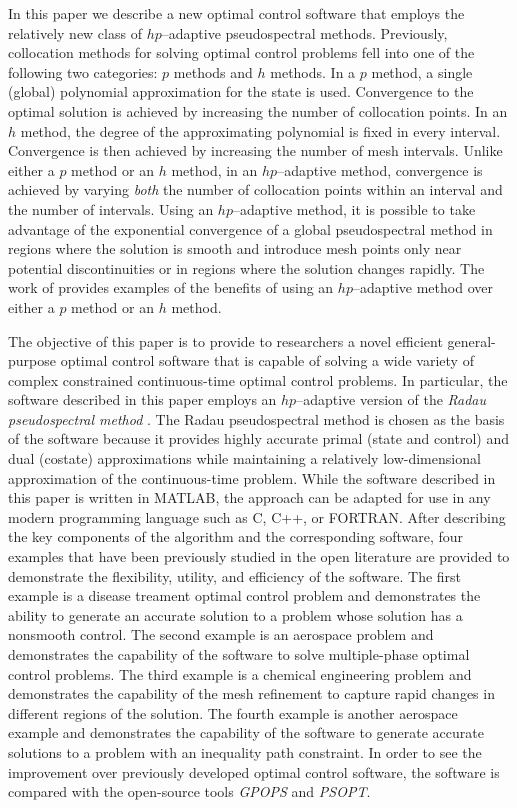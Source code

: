 \documentclass[prodmode,acmtecs]{acmsmall}
\begin{document}
In this paper we describe a new optimal control software that employs
the relatively new class of $hp$--adaptive pseudospectral methods.
Previously, collocation methods for solving optimal control problems
fell into one of the following two categories:  $p$ methods and $h$
methods.  In a $p$ method, a single (global) polynomial approximation
for the state 
is used.  Convergence to the optimal solution is achieved by
increasing the number of collocation points.  In an $h$ method, the
degree of the approximating polynomial is fixed in every interval.
Convergence is then achieved by increasing the number of mesh
intervals.  Unlike either a $p$ method or an $h$ method, in an
$hp$--adaptive method, convergence is achieved by varying {\em both}
the number of collocation points within an interval and the number of
intervals.  Using an $hp$--adaptive method, it is possible to take
advantage of the exponential convergence of a global pseudospectral
method in regions where the solution is smooth and introduce mesh
points only near potential discontinuities or in regions where the
solution changes rapidly.  The work of \cite{Darby1,Darby2} provides
examples of the benefits of using an $hp$--adaptive method over either
a $p$ method or an $h$ method. 

The objective of this paper is to provide to researchers a novel
efficient general-purpose optimal control software that is capable of
solving a wide variety of complex constrained continuous-time optimal
control problems.  In particular, the software described in this paper
employs an $hp$--adaptive version of the {\em Radau pseudospectral
  method} \cite{Garg1,Garg2,Garg3,Patterson1}.  The Radau
pseudospectral method is chosen as the basis of the software because 
it provides highly accurate primal (state and control) and dual
(costate) approximations while maintaining a relatively
low-dimensional approximation of the continuous-time problem.  While
the software described in this paper is written in MATLAB, the
approach can be adapted for use in any modern programming language
such as C, C++, or FORTRAN.  After describing the key components of
the algorithm and the corresponding software, four examples that have
been previously studied in the open literature are provided to
demonstrate the flexibility, utility, and efficiency of the software.
The first example is a disease treament optimal control problem and
demonstrates the ability to generate an accurate solution to a problem
whose solution has a nonsmooth control.  The second example is an
aerospace problem and demonstrates the capability of the software to
solve multiple-phase optimal control problems.  The third example is a
chemical engineering problem and demonstrates the capability of the
mesh refinement to capture rapid changes in different regions of the
solution.  The fourth example is another aerospace example and
demonstrates the capability of the software to generate accurate
solutions to a problem with an inequality path constraint.  In order
to see the improvement over previously developed optimal control
software, the software is compared with the open-source tools 
{\em GPOPS} and {\em PSOPT}.  
\end{document}
